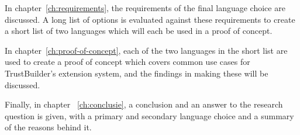 In chapter~\ref{ch:requirements}, the requirements of the final language choice are discussed. A long list of options is evaluated against these requirements to create a short list of two languages which will each be used in a proof of concept.

In chapter~\ref{ch:proof-of-concept}, each of the two languages in the short list are used to create a proof of concept which covers common use cases for TrustBuilder's extension system, and the findings in making these will be discussed.

Finally, in chapter ~\ref{ch:conclusie}, a conclusion and an answer to the research question is given, with a primary and secondary language choice and a summary of the reasons behind it.
